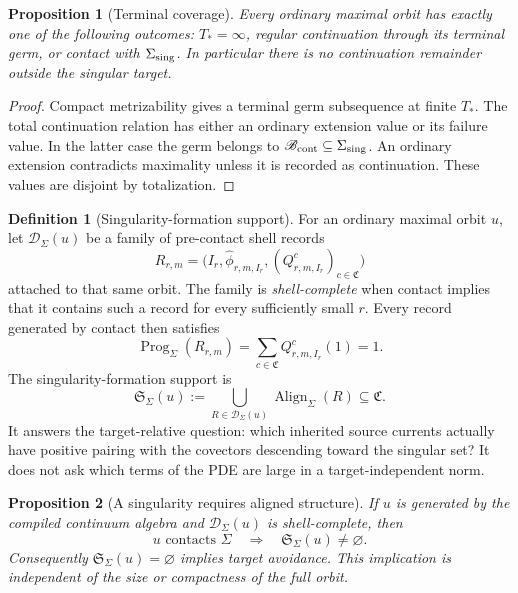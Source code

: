 \documentclass[11pt]{article}
\numberwithin{section}{part}
\theoremstyle{plain}
\newtheorem{proposition}[proposition]{Proposition}
\theoremstyle{definition}
\newtheorem{definition}[definition]{Definition}
\theoremstyle{remark}
\newcommand{\Channels}{\mathfrak C}
\newcommand{\Align}{\operatorname{Align}}
\begin{document}
\begin{proposition}[Terminal coverage]
\label{prop:terminal-coverage}
Every ordinary maximal orbit has exactly one of the following outcomes:
\(T_*=\infty\), regular continuation through its terminal germ, or contact
with \(\Sigma_{\rm sing}\).  In particular there is no continuation remainder
outside the singular target.
\end{proposition}

\begin{proof}
Compact metrizability gives a terminal germ subsequence at finite \(T_*\).
The total continuation relation has either an ordinary extension value or its
failure value.  In the latter case the germ belongs to
\(\mathscr B_{\rm cont}\subseteq\Sigma_{\rm sing}\).  An ordinary extension
contradicts maximality unless it is recorded as continuation.  These values
are disjoint by totalization.
\end{proof}

\begin{definition}[Singularity-formation support]
\label{def:singularity-formation-support}
For an ordinary maximal orbit \(u\), let
\(\mathscr D_\Sigma(u)\) be a family of pre-contact shell records
\[
 R_{r,m}=\bigl(I_r,\widehat\phi_{r,m,I_r},
              (Q^c_{r,m,I_r})_{c\in\Channels}\bigr)
\]
attached to that same orbit.  The family is \emph{shell-complete} when contact
implies that it contains such a record for every sufficiently small \(r\).
Every record generated by contact then satisfies
\begin{equation}
 \label{eq:contact-unit-shell-progress}
 \operatorname{Prog}_\Sigma(R_{r,m})
 =\sum_{c\in\Channels}Q^c_{r,m,I_r}(1)=1.
\end{equation}
The singularity-formation support is
\begin{equation}
 \label{eq:singularity-formation-support}
 \mathfrak S_\Sigma(u)
 :=\bigcup_{R\in\mathscr D_\Sigma(u)}\Align_\Sigma(R)
 \subseteq\Channels.
\end{equation}
It answers the target-relative question: which inherited source currents
actually have positive pairing with the covectors descending toward the
singular set?  It does not ask which terms of the PDE are large in a
target-independent norm.
\end{definition}

\begin{proposition}[A singularity requires aligned structure]
\label{prop:singularity-requires-aligned-structure}
If \(u\) is generated by the compiled continuum algebra and
\(\mathscr D_\Sigma(u)\) is shell-complete,
then
\begin{equation}
 \label{eq:contact-implies-formation-support}
 u\text{ contacts }\Sigma
 \quad\Longrightarrow\quad
 \mathfrak S_\Sigma(u)\ne\varnothing.
\end{equation}
Consequently \(\mathfrak S_\Sigma(u)=\varnothing\) implies target avoidance.
This implication is independent of the size or compactness of the full
orbit.
\end{proposition}
\end{document}
